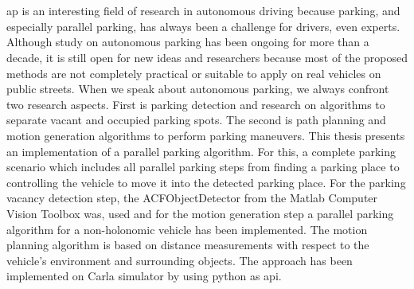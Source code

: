 \chapter{\abstractname}
\acrlong{ap} is an interesting field of research in autonomous driving because parking, and especially parallel parking, has always been a challenge for drivers, even experts. Although study on autonomous parking has been ongoing for more than a decade, it is still open for new ideas and researchers because most of the proposed methods are not completely practical or suitable to apply on real vehicles on public streets. When we speak about autonomous parking, we always confront two research aspects. First is parking detection and research on algorithms to separate vacant and occupied parking spots. The second is path planning and motion generation algorithms to perform parking maneuvers. This thesis presents an implementation of a parallel parking algorithm. For this, a complete parking scenario which includes all parallel parking steps from finding a parking place to controlling the vehicle to move it into the detected parking place. For the parking vacancy detection step, the ACFObjectDetector from the Matlab Computer Vision Toolbox was, used and for the motion generation step a parallel parking algorithm for a non-holonomic vehicle has been implemented. The motion planning algorithm is based on distance measurements with respect to the vehicle's environment and surrounding objects. The approach has been implemented on Carla simulator by using python as \acrshort{api}.


